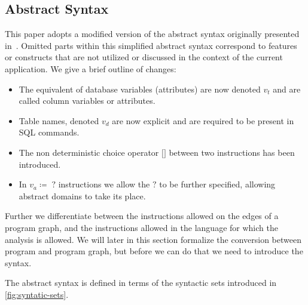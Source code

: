 \subsection{Abstract Syntax} \label{subsec:abstract-syntax}
This paper adopts a modified version of the abstract syntax originally presented in~\cite{cortesi_abstract_2013}.
Omitted parts within this simplified abstract syntax correspond to features or constructs that are not utilized or discussed in the context of the current application.
We give a brief outline of changes:
\begin{itemize}
    \item The equivalent of database variables (attributes) are now denoted $v_t$ and are called column variables or attributes.
    \item Table names, denoted $v_d$ are now explicit and are required to be present in SQL commands.
    \item The non deterministic choice operator $\texttt{[]}$ between two instructions has been introduced.
    \item In $v_a \coloneq \; ?$ instructions we allow the $?$ to be further specified, allowing abstract domains to take its place.
\end{itemize}

Further we differentiate between the instructions allowed on the edges of a program graph, and the instructions allowed in the language for which the analysis is allowed.
We will later in this section formalize the conversion between program and program graph, but before we can do that we need to introduce the syntax.

The abstract syntax is defined in terms of the syntactic sets introduced in \autoref{fig:syntatic-sets}.

